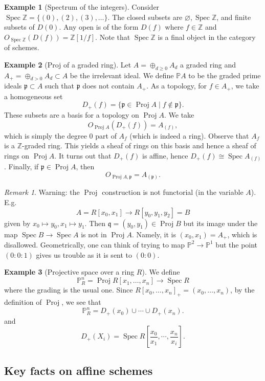 \documentclass{article}
\newcommand{\Z}{\mathbb{Z}}
\newcommand{\Proj}{\mathbb{P}}
\newcommand{\fr}{\mathfrak}
\DeclareMathOperator{\Pro}{Proj}
\DeclareMathOperator{\Spec}{Spec}
\theoremstyle{plain}
\theoremstyle{definition}
\newtheorem{exmp}{Example}
\theoremstyle{remark}
\newtheorem*{rem}{Remark}
\begin{document}
\begin{exmp}[Spectrum of the integers]
Consider $\Spec \Z=\{(0),(2),(3),\ldots\}$. The closed subsets are $\varnothing,\Spec\Z$, and finite subsets of $D(0)$. Any open is of the form $D(f)$ where $f\in\Z$ and $O_{\Spec \Z}(D(f))=\Z[1/f]$. Note that $\Spec\Z$ is a final object in the category of schemes.
\end{exmp}

\begin{exmp}[Proj of a graded ring]
Let $A=\oplus_{d\geq 0}A_d$ a graded ring and $A_+=\oplus_{d>0}A_d\subset A$ be the irrelevant ideal. We define $\Proj A$ to be the graded prime ideals $\fr p\subset A$ such that $\fr p$ does not contain $A_+$. As a topology, for $f\in A_+$, we take a homogeneous set
\[D_+(f)=\{\fr p\in\Pro A\mid f\notin\fr p\}.\]
These subsets are a basis for a topology on $\Pro A$. We take
\[O_{\Pro A}(D_+(f))=A_{(f)},\]
which is simply the degree 0 part of $A_f$ (which is indeed a ring). Observe that $A_f$ is a $\Z$-graded ring. This yields a sheaf of rings on this basis and hence a sheaf of rings on $\Pro A$. It turns out that $D_+(f)$ is affine, hence $D_+(f)\cong \Spec A_{(f)}$. Finally, if $\fr p\in \Pro A$, then
\[O_{\Pro A,\fr p}=A_{(\fr p)}.\]
\end{exmp}

\begin{rem}
Warning: the $\Pro$ construction is not functorial (in the variable $A$). E.g.
\[A=R[x_0,x_1]\to R[y_0,y_1,y_2]=B\]
given by $x_0\mapsto y_0,x_1\mapsto y_1$. Then $\fr q=(y_0,y_1)\in\Pro B$ but its image under the map $\Spec B\to\Spec A$ is not in $\Pro A$. Namely, it is $(x_0,x_1)=A_+$, which is disallowed. Geometrically, one can think of trying to map $\Proj^2\to\Proj^1$ but the point $(0:0:1)$ gives us trouble as it is sent to $(0:0)$.
\end{rem}

\begin{exmp}[Projective space over a ring $R$]
We define
\[\Proj^n_R=\Pro R[x_1,\ldots, x_n]\longrightarrow\Spec R\]
where the grading is the usual one. Since $R[x_0,\ldots, x_n]_+=(x_0,\ldots, x_n)$, by the definition of $\Pro$, we see that
\[\Proj^n_R=D_+(x_0)\cup\cdots\cup D_+(x_n).\]
and
\[D_+(X_i)=\Spec R[\frac{x_0}{x_1},\cdots,\frac{x_n}{x_i}].\]
\end{exmp}

\subsection*{Key facts on affine schemes}
\end{document}
